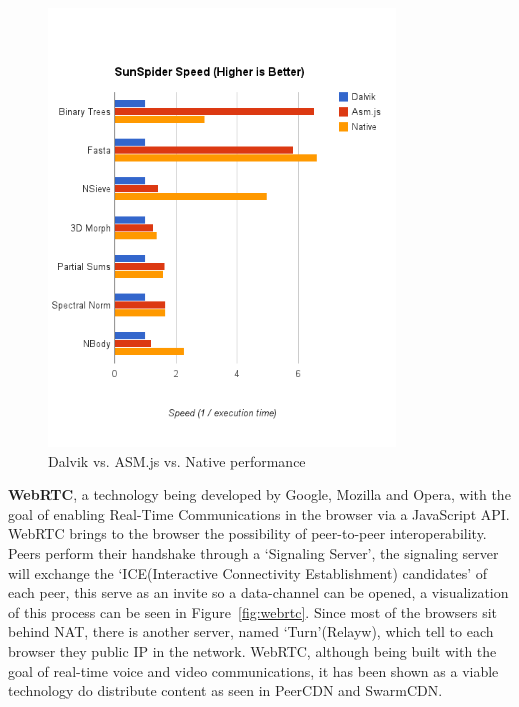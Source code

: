 \begin{figure}[h!]
  \centering
  \includegraphics[width=0.82\textwidth]{img/Dalvik-vs-ASM-vs-Native-edited}
  \caption{Dalvik vs. ASM.js vs. Native performance}
  \label{fig:dan}
\end{figure}

\textbf{WebRTC}\cite{IanHickson2013}, a technology being developed by Google, Mozilla and Opera, with the goal of enabling Real-Time Communications in the browser via a JavaScript API. WebRTC brings to the browser the possibility of peer-to-peer interoperability. Peers perform their handshake through a `Signaling Server', the signaling server will exchange the `ICE(Interactive Connectivity Establishment) candidates' of each peer, this serve as an invite so a data-channel can be opened, a visualization of this process can be seen in Figure~\ref{fig:webrtc}. Since most of the browsers sit behind NAT, there is another server, named `Turn'(Relayw), which tell to each browser they public IP in the network. WebRTC, although being built with the goal of real-time voice and video communications, it has been shown as a viable technology do distribute content as seen in PeerCDN and SwarmCDN\cite{Vogt}.

